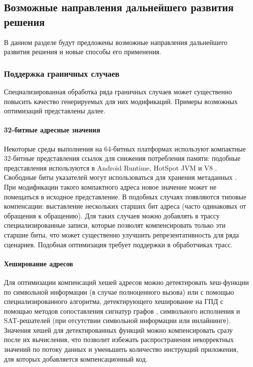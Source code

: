 \subsection{Возможные направления дальнейшего развития решения} \label{sec:future_work}

В данном разделе будут предложены возможные направления дальнейшего развития решения и новые способы его применения.

\subsubsection{Поддержка граничных случаев}

Специализированная обработка ряда граничных случаев может существенно повысить качество генерируемых для них модификаций. Примеры возможных оптимизаций представлены далее.

\paragraph{32-битные адресные значения}

Некоторые среды выполнения на 64-битных платформах используют компактные 32-битные представления ссылок для снижения потребления памяти: подобные представления используются в Android Runtime, HotSpot JVM и V8 \cite{android_art_object_reference,openjdk_compressed_oops,v8_pointer_compression}. Свободные биты указателей могут использоваться для хранения метаданных \cite{android_tagged_pointers,v8_pointer_compression}. При модификации такого компактного адреса новое значение может не помещаться в исходное представление. В подобных случаях появляются типовые компенсации: выставление нескольких старших бит адреса (часто одинаковых от обращения к обращению). Для таких случаев можно добавлять в трассу специализированные записи, которые позволят компенсировать только эти старшие биты, что может существенно улучшить репрезентативность для ряда сценариев. Подобная оптимизация требует поддержки в обработчиках трасс.

\paragraph{Хеширование адресов}

Для оптимизации компенсаций хешей адресов можно детектировать хеш-функции по символьной информации (в случае полноценного вызова) или с помощью специализированного алгоритма, детектирующего хеширование на ГПД с помощью методов сопоставления сигнатур графов \cite{binary_code_similarity_survey,graph_matching_survey}, символьного исполнения \cite{king_symbolic_execution} и SAT-решателей \cite{handbook_of_satisfiability} (при отсутствии символьной информации или инлайнинге). Значения хешей для детектированных функций можно компенсировать сразу после их вычисления, что позволит избежать распространения некорректных значений по потоку данных и уменьшить количество инструкций приложения, для которых добавляется компенсационный код.

